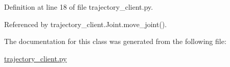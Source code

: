 Definition at line 18 of file trajectory\+\_\+client.\+py.



Referenced by trajectory\+\_\+client.\+Joint.\+move\+\_\+joint().



The documentation for this class was generated from the following file\+:\begin{DoxyCompactItemize}
\item 
\hyperlink{trajectory__client_8py}{trajectory\+\_\+client.\+py}\end{DoxyCompactItemize}
